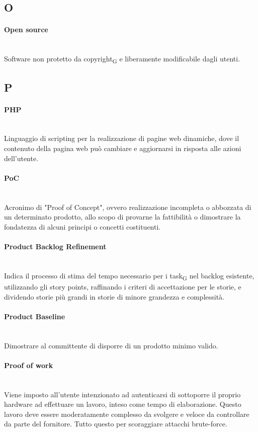 \subsection*{O}
\paragraph{Open source}~\smallskip \\
Software non protetto da copyright\textsubscript{G} e liberamente modificabile dagli utenti.
\newpage
{}
\subsection*{P}
\paragraph{PHP}~\smallskip \\
Linguaggio di scripting per la realizzazione di pagine web dinamiche, dove il contenuto della pagina web può cambiare e aggiornarsi in risposta alle azioni dell'utente.

\paragraph{PoC}~\smallskip \\
Acronimo di "Proof of Concept", ovvero realizzazione incompleta o abbozzata di un determinato prodotto, allo scopo di provarne la fattibilità o dimostrare la fondatezza di alcuni principi o concetti costituenti.

\paragraph{Product Backlog Refinement}~\smallskip \\
Indica il processo di stima del tempo necessario per i task\textsubscript{G} nel backlog esistente, utilizzando gli story points, 
raffinando i criteri di accettazione per le storie, e dividendo storie più grandi in storie di minore grandezza e complessità.

\paragraph{Product Baseline}~\smallskip \\
Dimostrare al committente di disporre di un prodotto minimo valido.

\paragraph{Proof of work}~\smallskip \\
Viene imposto all'utente intenzionato ad autenticarsi di sottoporre il proprio hardware ad effettuare un lavoro, inteso come tempo di elaborazione. Questo lavoro deve essere moderatamente complesso da svolgere e veloce da controllare da parte del fornitore. Tutto questo per scoraggiare attacchi brute-force.

